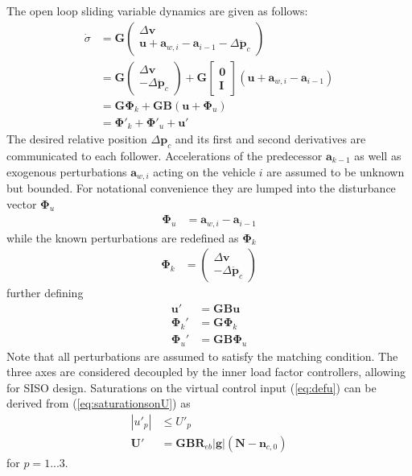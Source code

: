 \documentclass{ifacconf}
\providecommand{\mbf}[1]{\mathbf{#1}}
\newcommand{\idxFollower}{{\ensuremath{i} }}
\newcommand{\idxPredecessor}{{\ensuremath{i-1} }}
\newcommand{\idxAxis}{{\ensuremath{p}}}
\begin{document}
The open loop sliding variable dynamics are given as follows:
\begin{align}
\dot{{\sigma}} &= \mbf{G}
\begin{pmatrix}
\Delta \mbf{v} \\
\mbf{u} + \mbf{a}_{w,\idxFollower}
 - \mbf{a}_\idxPredecessor -  \Delta \ddot{\mbf{p}}_c
\end{pmatrix}\\
& = \mbf{G}
\begin{pmatrix}
\Delta \mbf{v} \\
 - \Delta \ddot{\mbf{p}}_c
\end{pmatrix} 
+ \mbf{G}
\begin{bmatrix}
{\mbf{0}}\\
{\mbf{I}}
\end{bmatrix}
(\mbf{u} + \mbf{a}_{w,\idxFollower} - \mbf{a}_\idxPredecessor) \\
&= \mbf{G} \mbf{\Phi}_k + \mbf{G} \mbf{B}(
\mbf{u}
 + {\mbf\Phi}_u)
\label{eq:sigmadynconti}\\
&= \mbf{\Phi}'_k + \mbf{\Phi}'_u + \mbf{u}'
\label{eq:sigmadyncontishort}
\end{align}
The  desired relative position $\Delta \mbf{p}_c$ and its first and second derivatives are communicated to each follower. Accelerations of the predecessor $\mbf{a}_{k-1}$ as well as exogenous perturbations $\mbf{a}_{w, \idxFollower} $ acting on the vehicle $i$ are assumed to be unknown but bounded. For notational convenience they are lumped into the disturbance vector $\mbf{\Phi}_u$
\begin{align}
\mbf{\Phi}_u &= \mbf{a}_{w,\idxFollower} - \mbf{a}_\idxPredecessor
\end{align}
while the known perturbations are redefined as $\mbf{\Phi}_k$
\begin{align}
\mbf{\Phi}_k &= 
\begin{pmatrix}
\Delta \mbf{v} \\
 - \Delta \ddot{\mbf{p}}_c
\end{pmatrix} 
\end{align}
further defining
\begin{align}
\mbf{u}' &= \mbf{GB}\mbf{u}
\label{eq:defu}\\
\mbf{\Phi}_k' &= \mbf{G}\mbf{\Phi}_k \\
\mbf{\Phi}_u' &= \mbf{GB}\mbf{\Phi}_u
\end{align}
Note that all perturbations are assumed to satisfy the matching condition.
The three axes are considered decoupled by the inner load factor controllers, allowing for SISO design.
Saturations on the virtual control input (\ref{eq:defu}) can be derived from (\ref{eq:saturationsonU}) as
\begin{align}
|{u}'_\idxAxis| &\leq {U}'_\idxAxis \\
\mbf{U}' &= \mbf{GB} \mbf{R}_{eb} |\mbf{g}|(\mbf{N}-\mbf{n}_{c,0})
\end{align}
for $\idxAxis=1...3$.
\end{document}
